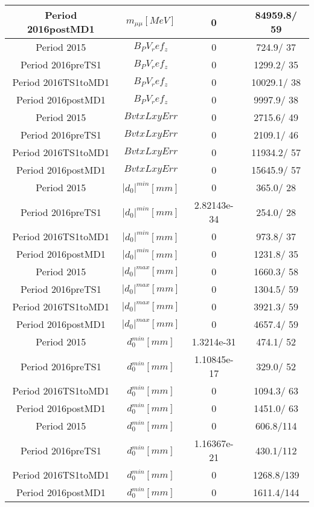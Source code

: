 \documentclass{article}
\begin{document}
\begin{longtable}{c|c|c|c}
\hline
 Period 2016postMD1 & $m_{\mu\mu} [MeV]$ & 0 & 84959.8/ 59\\
\hline
 Period 2015 & $B_PV_ref_z$ & 0 & 724.9/ 37\\
\hline
 Period 2016preTS1 & $B_PV_ref_z$ & 0 & 1299.2/ 35\\
\hline
 Period 2016TS1toMD1 & $B_PV_ref_z$ & 0 & 10029.1/ 38\\
\hline
 Period 2016postMD1 & $B_PV_ref_z$ & 0 & 9997.9/ 38\\
\hline
 Period 2015 & $BvtxLxyErr$ & 0 & 2715.6/ 49\\
\hline
 Period 2016preTS1 & $BvtxLxyErr$ & 0 & 2109.1/ 46\\
\hline
 Period 2016TS1toMD1 & $BvtxLxyErr$ & 0 & 11934.2/ 57\\
\hline
 Period 2016postMD1 & $BvtxLxyErr$ & 0 & 15645.9/ 57\\
\hline
 Period 2015 & $|d_{0}|^{min} [mm]$ & 0 & 365.0/ 28\\
\hline
 Period 2016preTS1 & $|d_{0}|^{min} [mm]$ & 2.82143e-34 & 254.0/ 28\\
\hline
 Period 2016TS1toMD1 & $|d_{0}|^{min} [mm]$ & 0 & 973.8/ 37\\
\hline
 Period 2016postMD1 & $|d_{0}|^{min} [mm]$ & 0 & 1231.8/ 35\\
\hline
 Period 2015 & $|d_{0}|^{max} [mm]$ & 0 & 1660.3/ 58\\
\hline
 Period 2016preTS1 & $|d_{0}|^{max} [mm]$ & 0 & 1304.5/ 59\\
\hline
 Period 2016TS1toMD1 & $|d_{0}|^{max} [mm]$ & 0 & 3921.3/ 59\\
\hline
 Period 2016postMD1 & $|d_{0}|^{max} [mm]$ & 0 & 4657.4/ 59\\
\hline
 Period 2015 & $d_{0}^{min} [mm]$ & 1.3214e-31 & 474.1/ 52\\
\hline
 Period 2016preTS1 & $d_{0}^{min} [mm]$ & 1.10845e-17 & 329.0/ 52\\
\hline
 Period 2016TS1toMD1 & $d_{0}^{min} [mm]$ & 0 & 1094.3/ 63\\
\hline
 Period 2016postMD1 & $d_{0}^{min} [mm]$ & 0 & 1451.0/ 63\\
\hline
 Period 2015 & $d_{0}^{min} [mm]$ & 0 & 606.8/114\\
\hline
 Period 2016preTS1 & $d_{0}^{min} [mm]$ & 1.16367e-21 & 430.1/112\\
\hline
 Period 2016TS1toMD1 & $d_{0}^{min} [mm]$ & 0 & 1268.8/139\\
\hline
 Period 2016postMD1 & $d_{0}^{min} [mm]$ & 0 & 1611.4/144\\

\end{longtable}
\end{document}
